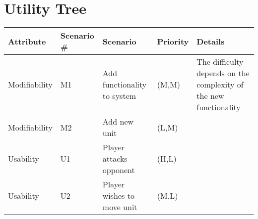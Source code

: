 \section{Utility Tree}


\begin{tabular}{|l|l|l|l|m{}|}
  \hline
  {\bf Attribute} & {\bf Scenario \#} & {\bf Scenario} & {\bf Priority} &
    {\bf Details} \\ \hline
  Modifiability & M1 & Add functionality to system & (M,M) & The difficulty
  depends on the complexity of the new functionality \\ \hline
  Modifiability & M2 & Add new unit & (L,M) & \\ \hline
  Usability & U1 & Player attacks opponent & (H,L) & \\ \hline
  Usability & U2 & Player wishes to move unit & (M,L) & \\ \hline
\end{tabular}
